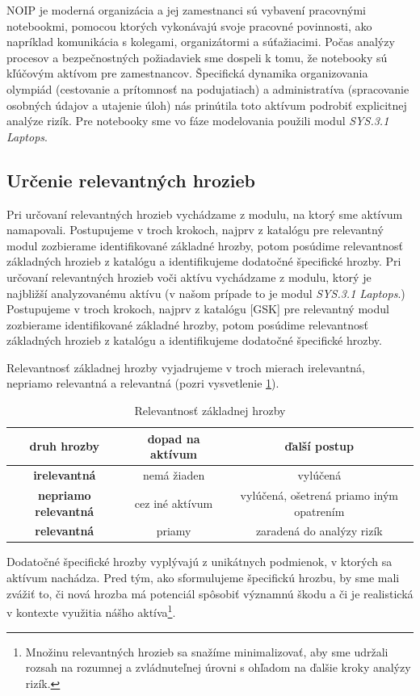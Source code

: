 NOIP je moderná organizácia a jej zamestnanci sú vybavení pracovnými notebookmi, pomocou ktorých vykonávajú svoje pracovné povinnosti, ako napríklad
komunikácia s kolegami, organizátormi a súťažiacimi. Počas analýzy procesov a bezpečnostných požiadaviek sme dospeli k tomu, že notebooky sú kľúčovým
aktívom pre zamestnancov. Špecifická dynamika organizovania olympiád (cestovanie a prítomnosť na podujatiach) a administratíva (spracovanie osobných
údajov a utajenie úloh) nás prinútila toto aktívum podrobiť explicitnej analýze rizík. Pre notebooky sme vo fáze modelovania použili modul \cite{GSK}
\emph{SYS.3.1 Laptops}.

\subsection{Určenie relevantných hrozieb}
Pri určovaní relevantných hrozieb vychádzame z modulu, na ktorý sme aktívum namapovali. Postupujeme v troch krokoch, najprv z katalógu \cite{GSK}
pre relevantný modul zozbierame identifikované základné hrozby, potom posúdime relevantnosť základných hrozieb z katalógu a identifikujeme
dodatočné špecifické hrozby. Pri určovaní relevantných hrozieb voči aktívu vychádzame z modulu, ktorý je najbližší analyzovanému aktívu (v našom
prípade to je modul \emph{SYS.3.1 Laptops}.) Postupujeme v troch krokoch, najprv z katalógu [GSK] pre relevantný modul zozbierame identifikované
základné hrozby, potom posúdime relevantnosť základných hrozieb z katalógu a identifikujeme dodatočné špecifické hrozby. 

Relevantnosť základnej hrozby vyjadrujeme v troch mierach irelevantná, nepriamo relevantná a relevantná (pozri vysvetlenie \ref{tab:elemthreatrel}).
\begin{table}
    \caption{Relevantnosť základnej hrozby}
    \label{tab:elemthreatrel}
    \begin{center}
        \begin{tabular}{ |c|c|c| } 
         \hline
         \textbf{druh hrozby} & \textbf{dopad na aktívum} & \textbf{ďalší postup} \\ 
         \hline
         \hline
         \textbf{irelevantná} & nemá žiaden & vylúčená \\ 
         \hline
         \textbf{nepriamo relevantná} & cez iné aktívum & vylúčená, ošetrená priamo iným opatrením  \\ 
         \hline
         \textbf{relevantná} & priamy & zaradená do analýzy rizík \\ 
         \hline
        \end{tabular}
    \end{center}
\end{table}
Dodatočné špecifické hrozby vyplývajú z unikátnych podmienok, v ktorých sa aktívum nachádza. Pred tým, ako sformulujeme špecifickú hrozbu,
by sme mali zvážiť to, či nová hrozba má potenciál spôsobiť významnú škodu a či je realistická v kontexte využitia nášho aktíva\footnote{
Množinu relevantných hrozieb sa snažíme minimalizovať, aby sme udržali rozsah na rozumnej a zvládnuteľnej úrovni s ohľadom na ďalšie kroky
analýzy rizík.}.

